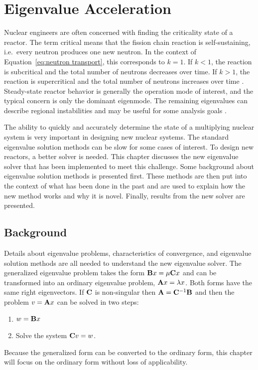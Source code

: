 
\chapter{Eigenvalue Acceleration}
\label{sec:Chp3}
Nuclear engineers are often concerned with finding the criticality state of a reactor. The term critical means that the fission chain reaction is self-sustaining, i.e.\ every neutron produces one new neutron. In the context of Equation~\ref{eq:neutron transport}, this corresponds to $k = 1$. If $k < 1$, the reaction is subcritical and the total number of neutrons decreases over time. If $k > 1$, the reaction is supercritical and the total number of neutrons increases over time \cite{Duderstadt1976}. Steady-state reactor behavior is generally the operation mode of interest, and the typical concern is only the dominant eigenmode. The remaining eigenvalues can describe regional instabilities and may be useful for some analysis goals \cite{Vidal1998}. 

The ability to quickly and accurately determine the state of a multiplying nuclear system is very important in designing new nuclear systems. The standard eigenvalue solution methods can be slow for some cases of interest. To design new reactors, a better solver is needed. This chapter discusses the new eigenvalue solver that has been implemented to meet this challenge. Some background about eigenvalue solution methods is presented first. These methods are then put into the context of what has been done in the past and are used to explain how the new method works and why it is novel. Finally, results from the new solver are presented.

\section{Background}
Details about eigenvalue problems, characteristics of convergence, and eigenvalue solution methods are all needed to understand the new eigenvalue solver. The generalized eigenvalue problem takes the form $\mathbf{B}x = \mu \mathbf{C}x$ and can be transformed into an ordinary eigenvalue problem, $\mathbf{A}x = \lambda x$. Both forms have the same right eigenvectors. If $\mathbf{C}$ is non-singular then $\mathbf{A} = \mathbf{C}^{-1}\mathbf{B}$ and then the problem $v = \mathbf{A}x$ can be solved in two steps: \cite{Stewart2001}
%
\begin{enumerate}
  \item $w = \mathbf{B}x$
  \item Solve the system $\mathbf{C}v = w$.
\end{enumerate}
%
Because the generalized form can be converted to the ordinary form, this chapter will focus on the ordinary form without loss of applicability.

